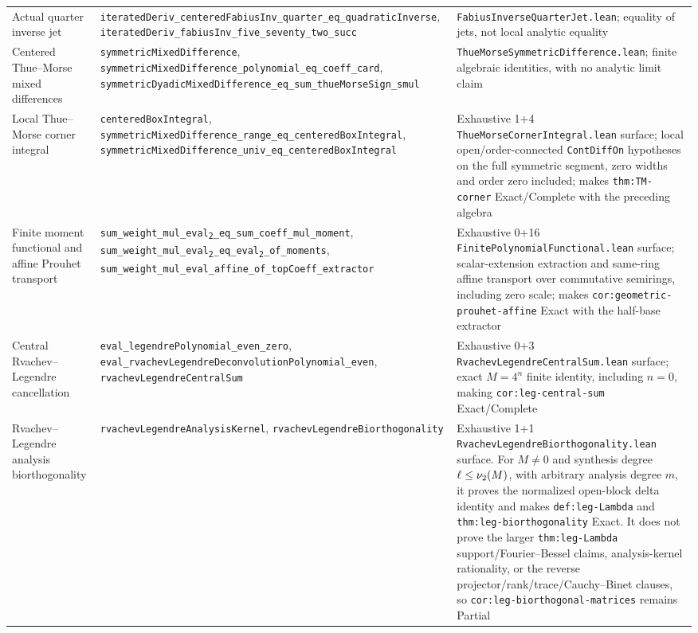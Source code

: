 \documentclass[11pt,oneside]{article}
\theoremstyle{definition}
\theoremstyle{remark}
\begin{document}
\begin{longtable}{@{}>{\raggedright\arraybackslash}p{} >{\raggedright\arraybackslash}p{} >{\raggedright\arraybackslash}p{}@{}}
Actual quarter inverse jet & \nolinkurl{iteratedDeriv_centeredFabiusInv_quarter_eq_quadraticInverse}, \nolinkurl{iteratedDeriv_fabiusInv_five_seventy_two_succ} & \nolinkurl{FabiusInverseQuarterJet.lean}; equality of jets, not local analytic equality \\
Centered Thue--Morse mixed differences & \nolinkurl{symmetricMixedDifference}, \nolinkurl{symmetricMixedDifference_polynomial_eq_coeff_card}, \nolinkurl{symmetricDyadicMixedDifference_eq_sum_thueMorseSign_smul} & \nolinkurl{ThueMorseSymmetricDifference.lean}; finite algebraic identities, with no analytic limit claim \\
Local Thue--Morse corner integral & \nolinkurl{centeredBoxIntegral}, \nolinkurl{symmetricMixedDifference_range_eq_centeredBoxIntegral}, \nolinkurl{symmetricMixedDifference_univ_eq_centeredBoxIntegral} & Exhaustive 1+4 \nolinkurl{ThueMorseCornerIntegral.lean} surface; local open/order-connected \nolinkurl{ContDiffOn} hypotheses on the full symmetric segment, zero widths and order zero included; makes \nolinkurl{thm:TM-corner} Exact/Complete with the preceding algebra \\
Finite moment functional and affine Prouhet transport & \nolinkurl{sum_weight_mul_eval}\texttt{\textsubscript{2}}\nolinkurl{_eq_sum_coeff_mul_moment}, \nolinkurl{sum_weight_mul_eval}\texttt{\textsubscript{2}}\nolinkurl{_eq_eval}\texttt{\textsubscript{2}}\nolinkurl{_of_moments}, \nolinkurl{sum_weight_mul_eval_affine_of_topCoeff_extractor} & Exhaustive 0+16 \nolinkurl{FinitePolynomialFunctional.lean} surface; scalar-extension extraction and same-ring affine transport over commutative semirings, including zero scale; makes \nolinkurl{cor:geometric-prouhet-affine} Exact with the half-base extractor \\
Central Rvachev--Legendre cancellation & \nolinkurl{eval_legendrePolynomial_even_zero}, \nolinkurl{eval_rvachevLegendreDeconvolutionPolynomial_even}, \nolinkurl{rvachevLegendreCentralSum} & Exhaustive 0+3 \nolinkurl{RvachevLegendreCentralSum.lean} surface; exact \(M=4^n\) finite identity, including \(n=0\), making \nolinkurl{cor:leg-central-sum} Exact/Complete \\
Rvachev--Legendre analysis biorthogonality & \nolinkurl{rvachevLegendreAnalysisKernel}, \nolinkurl{rvachevLegendreBiorthogonality} & Exhaustive 1+1 \nolinkurl{RvachevLegendreBiorthogonality.lean} surface.  For \(M\ne0\) and synthesis degree \(\ell\leq\nu_{2}(M)\), with arbitrary analysis degree \(m\), it proves the normalized open-block delta identity and makes \nolinkurl{def:leg-Lambda} and \nolinkurl{thm:leg-biorthogonality} Exact.  It does not prove the larger \nolinkurl{thm:leg-Lambda} support/Fourier--Bessel claims, analysis-kernel rationality, or the reverse projector/rank/trace/Cauchy--Binet clauses, so \nolinkurl{cor:leg-biorthogonal-matrices} remains Partial \\

\end{longtable}
\end{document}
